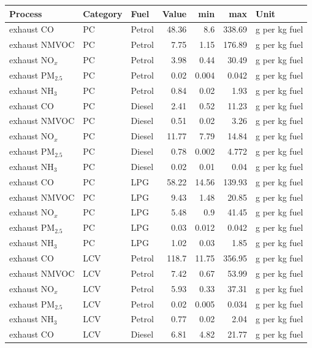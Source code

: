 \begin{table}[!htbp]
\centering
\scriptsize
\setlength{\tabcolsep}{3pt}
\begin{tabular}{@{}lllrrrl@{}}
\toprule
\textbf{Process} & \textbf{Category} & \textbf{Fuel} & \textbf{Value} & \textbf{min} & \textbf{max} & \textbf{Unit} \\
\midrule
exhaust CO & PC & Petrol & 48.36 & 8.6 & 338.69 & g per kg fuel \\
exhaust NMVOC & PC & Petrol & 7.75 & 1.15 & 176.89 & g per kg fuel \\
exhaust NO$_x$ & PC & Petrol & 3.98 & 0.44 & 30.49 & g per kg fuel \\
exhaust PM$_{2.5}$ & PC & Petrol & 0.02 & 0.004 & 0.042 & g per kg fuel \\
exhaust NH$_3$ & PC & Petrol & 0.84 & 0.02 & 1.93 & g per kg fuel \\
exhaust CO & PC & Diesel & 2.41 & 0.52 & 11.23 & g per kg fuel \\
exhaust NMVOC & PC & Diesel & 0.51 & 0.02 & 3.26 & g per kg fuel \\
exhaust NO$_x$ & PC & Diesel & 11.77 & 7.79 & 14.84 & g per kg fuel \\
exhaust PM$_{2.5}$ & PC & Diesel & 0.78 & 0.002 & 4.772 & g per kg fuel \\
exhaust NH$_3$ & PC & Diesel & 0.02 & 0.01 & 0.04 & g per kg fuel \\
exhaust CO & PC & LPG & 58.22 & 14.56 & 139.93 & g per kg fuel \\
exhaust NMVOC & PC & LPG & 9.43 & 1.48 & 20.85 & g per kg fuel \\
exhaust NO$_x$ & PC & LPG & 5.48 & 0.9 & 41.45 & g per kg fuel \\
exhaust PM$_{2.5}$ & PC & LPG & 0.03 & 0.012 & 0.042 & g per kg fuel \\
exhaust NH$_3$ & PC & LPG & 1.02 & 0.03 & 1.85 & g per kg fuel \\
exhaust CO & LCV & Petrol & 118.7 & 11.75 & 356.95 & g per kg fuel \\
exhaust NMVOC & LCV & Petrol & 7.42 & 0.67 & 53.99 & g per kg fuel \\
exhaust NO$_x$ & LCV & Petrol & 5.93 & 0.33 & 37.31 & g per kg fuel \\
exhaust PM$_{2.5}$ & LCV & Petrol & 0.02 & 0.005 & 0.034 & g per kg fuel \\
exhaust NH$_3$ & LCV & Petrol & 0.77 & 0.02 & 2.04 & g per kg fuel \\
exhaust CO & LCV & Diesel & 6.81 & 4.82 & 21.77 & g per kg fuel \\

\end{tabular}
\end{table}
